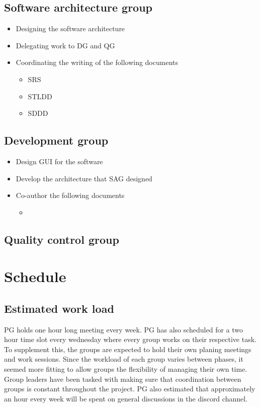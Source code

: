 \documentclass{article}
\begin{document}
    \subsection{Software architecture group}
        \begin{itemize}
            \item Designing the software architecture
            \item Delegating work to DG and QG
            \item Coordinating the writing of the following documents
                \begin{itemize}
                    \item SRS
                    \item STLDD
                    \item SDDD
                \end{itemize}
        \end{itemize}
            
    \subsection{Development group}
        \begin{itemize}
            \item Design GUI for the software
            \item Develop the architecture that SAG designed
            \item Co-author the following documents
                \begin{itemize}
                    \item 
                \end{itemize}
        \end{itemize}
        
    
    \subsection{Quality control group}

\newpage

\section{Schedule}
        
    \subsection{Estimated work load}
        PG holds one hour long meeting every week. PG has also scheduled for a two hour time slot every wednesday where every group works on their respective task. To supplement this, the groups are expected to hold their own planing meetings and work sessions. Since the workload of each group varies between phases, it seemed more fitting to allow groups the flexibility of managing their own time. Group leaders have been tasked with making sure that coordination between groups is constant throughout the project. PG also estimated that approximately an hour every week will be spent on general discussions in the discord channel.
        
\end{document}
